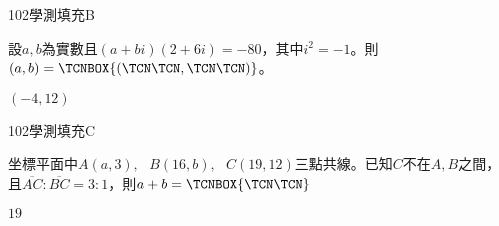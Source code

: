     \begin{QUESTION}
        \begin{ExamInfo}{102}{學測}{填充}{B}
        \end{ExamInfo}
        \begin{ExamAnsRateInfo}{59}{97}{71}{9}
        \end{ExamAnsRateInfo}
        \begin{QBODY}
            設$a,b$為實數且$(a+bi)(2+6i)=-80$，其中${{i}^{2}}=-1$。則$(a,b)=\TCNBOX{(\TCN\TCN,\TCN\TCN)}$。
        \end{QBODY}
        \begin{QFROMS}
        \end{QFROMS}
        \begin{QTAGS}\end{QTAGS}
        \begin{QANS}
            $(-4,12)$
        \end{QANS}
        \begin{QSOLLIST}
        \end{QSOLLIST}
        \begin{QEMPTYSPACE}
        \end{QEMPTYSPACE}
    \end{QUESTION}
    \begin{QUESTION}
        \begin{ExamInfo}{102}{學測}{填充}{C}
        \end{ExamInfo}
        \begin{ExamAnsRateInfo}{64}{94}{74}{24}
        \end{ExamAnsRateInfo}
        \begin{QBODY}
            坐標平面中$A(a,3),\text{ }B(16,b),\text{ }C(19,12)$三點共線。已知$C$不在$A,B$之間，且$\overline{AC}:\overline{BC}=3:1$，則$a+b=\TCNBOX{\TCN\TCN}$
        \end{QBODY}
        \begin{QFROMS}
        \end{QFROMS}
        \begin{QTAGS}\end{QTAGS}
        \begin{QANS}
            $19$
        \end{QANS}
        \begin{QSOLLIST}
        \end{QSOLLIST}
        \begin{QEMPTYSPACE}
        \end{QEMPTYSPACE}
    \end{QUESTION}
